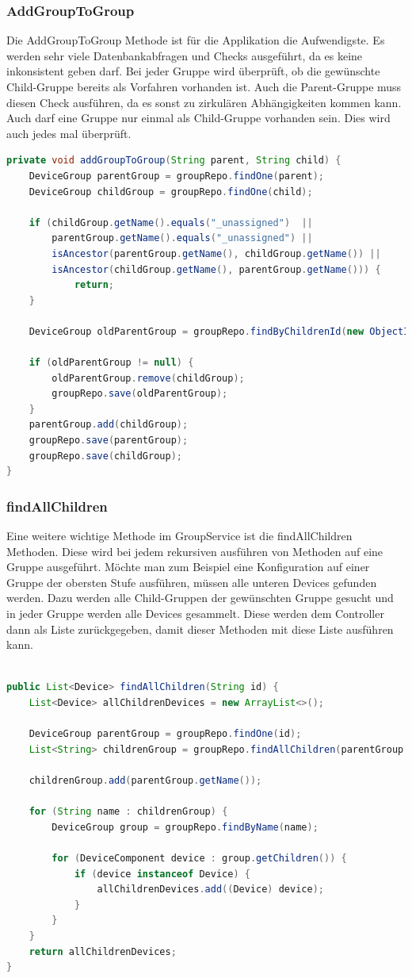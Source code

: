 \subsubsection{AddGroupToGroup}
Die AddGroupToGroup Methode ist für die Applikation die Aufwendigste. Es werden sehr viele Datenbankabfragen und Checks ausgeführt, da es keine inkonsistent geben darf. Bei jeder Gruppe wird überprüft, ob die gewünschte Child-Gruppe bereits als Vorfahren vorhanden ist. Auch die Parent-Gruppe muss diesen Check ausführen, da es sonst zu zirkulären Abhängigkeiten kommen kann. Auch darf eine Gruppe nur einmal als Child-Gruppe vorhanden sein. Dies wird auch jedes mal überprüft. 
\begin{lstlisting}[language=java]
private void addGroupToGroup(String parent, String child) {
	DeviceGroup parentGroup = groupRepo.findOne(parent);
	DeviceGroup childGroup = groupRepo.findOne(child);

	if (childGroup.getName().equals("_unassigned")  ||
		parentGroup.getName().equals("_unassigned") ||
		isAncestor(parentGroup.getName(), childGroup.getName()) ||
		isAncestor(childGroup.getName(), parentGroup.getName())) {
			return;
	}

	DeviceGroup oldParentGroup = groupRepo.findByChildrenId(new ObjectId(childGroup.getId()));
		
	if (oldParentGroup != null) {
		oldParentGroup.remove(childGroup);
		groupRepo.save(oldParentGroup);
	}
	parentGroup.add(childGroup);
	groupRepo.save(parentGroup);
	groupRepo.save(childGroup);
}
\end{lstlisting}

\subsubsection{findAllChildren}
Eine weitere wichtige Methode im GroupService ist die findAllChildren Methoden. Diese wird bei jedem rekursiven ausführen von Methoden auf eine Gruppe ausgeführt. Möchte man zum Beispiel eine Konfiguration auf einer Gruppe der obersten Stufe ausführen, müssen alle unteren Devices gefunden werden. Dazu werden alle Child-Gruppen der gewünschten Gruppe gesucht und in jeder Gruppe werden alle Devices gesammelt. Diese werden dem Controller dann als Liste zurückgegeben, damit dieser Methoden mit diese Liste ausführen kann. 

\begin{lstlisting}[language=java]

public List<Device> findAllChildren(String id) {
	List<Device> allChildrenDevices = new ArrayList<>();

	DeviceGroup parentGroup = groupRepo.findOne(id);
	List<String> childrenGroup = groupRepo.findAllChildren(parentGroup.getName());

	childrenGroup.add(parentGroup.getName());

	for (String name : childrenGroup) {
		DeviceGroup group = groupRepo.findByName(name);

		for (DeviceComponent device : group.getChildren()) {
			if (device instanceof Device) {
				allChildrenDevices.add((Device) device);
			}
		}
	}
	return allChildrenDevices;
}
\end{lstlisting}


